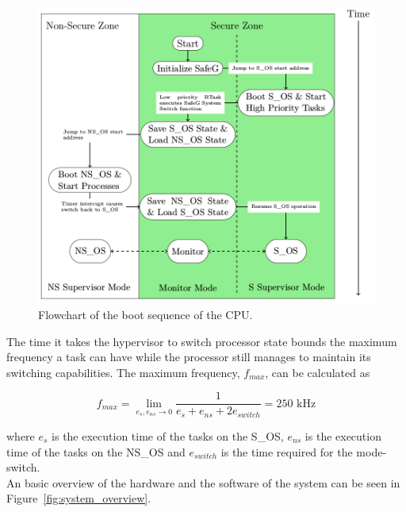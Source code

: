 \begin{figure}[H]
\centering
\includegraphics[width=\textwidth]{./img/literature_modeswitch.png}
\caption{Flowchart of the boot sequence of the CPU. \cite{zaki2016}}\label{fig:modeswitch}
\end{figure}

The time it takes the hypervisor to switch processor state bounds the maximum frequency a task can have while the processor still manages to maintain its switching capabilities. The maximum frequency, $f_{max}$, can be calculated as

$$f_{max} = \lim_{e_s, e_{ns} \to 0} \frac{1}{e_s+e_{ns}+2e_{switch}} = 250\textrm{ kHz}$$

where $e_s$ is the execution time of the tasks on the S\_OS, $e_{ns}$ is the execution time of the tasks on the NS\_OS and $e_{switch}$ is the time required for the mode-switch.\\

An basic overview of the hardware and the software of the system can be seen in Figure~\ref{fig:system_overview}.

